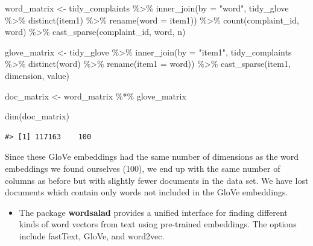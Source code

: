 \documentclass[
]{krantz}
\makeatletter
\newenvironment{Shaded}{\begin{snugshade}}{\end{snugshade}}
\newcommand{\AttributeTok}[1]{\textcolor[rgb]{0.77,0.63,0.00}{#1}}
\newcommand{\FunctionTok}[1]{\textcolor[rgb]{0.00,0.00,0.00}{#1}}
\newcommand{\NormalTok}[1]{#1}
\newcommand{\OtherTok}[1]{\textcolor[rgb]{0.56,0.35,0.01}{#1}}
\newcommand{\SpecialCharTok}[1]{\textcolor[rgb]{0.00,0.00,0.00}{#1}}
\newcommand{\StringTok}[1]{\textcolor[rgb]{0.31,0.60,0.02}{#1}}
\newenvironment{kframe}{%
\medskip{}
\setlength{\fboxsep}{.8em}
 \def\at@end@of@kframe{}%
 \ifinner\ifhmode%
  \def\at@end@of@kframe{\end{minipage}}%
  \begin{minipage}{\columnwidth}%
 \fi\fi%
 \def\FrameCommand##1{\hskip\@totalleftmargin \hskip-\fboxsep
 \colorbox{shadecolor}{##1}\hskip-\fboxsep
     \hskip-\linewidth \hskip-\@totalleftmargin \hskip\columnwidth}%
 \MakeFramed {\advance\hsize-\width
   \@totalleftmargin\z@ \linewidth\hsize
   \@setminipage}}%
 {\par\unskip\endMakeFramed%
 \at@end@of@kframe}
\renewenvironment{Shaded}{\begin{kframe}}{\end{kframe}}
\newenvironment{rmdblock}[1]
  {\begin{shaded*}
  \begin{itemize}[left = -1cm, labelsep = 1cm]
  \renewcommand{\labelitemi}{
    \raisebox{-.7\height}[0pt][0pt]{
      {\setkeys{Gin}{width=3em,keepaspectratio}\texttt{[image: images/\#1]}}
    }
  }
 
  \item
  }
  {
  \end{itemize}
  \end{shaded*}
  }
\newenvironment{rmdpackage}
  {\begin{rmdblock}{package}}
  {\end{rmdblock}}
\makeatother
\begin{document}
\begin{Shaded}
\begin{Highlighting}[]
\NormalTok{word\_matrix }\OtherTok{\textless{}{-}}\NormalTok{ tidy\_complaints }\SpecialCharTok{\%\textgreater{}\%}
  \FunctionTok{inner\_join}\NormalTok{(}\AttributeTok{by =} \StringTok{"word"}\NormalTok{,}
\NormalTok{             tidy\_glove }\SpecialCharTok{\%\textgreater{}\%}
               \FunctionTok{distinct}\NormalTok{(item1) }\SpecialCharTok{\%\textgreater{}\%}
               \FunctionTok{rename}\NormalTok{(}\AttributeTok{word =}\NormalTok{ item1)) }\SpecialCharTok{\%\textgreater{}\%}
  \FunctionTok{count}\NormalTok{(complaint\_id, word) }\SpecialCharTok{\%\textgreater{}\%}
  \FunctionTok{cast\_sparse}\NormalTok{(complaint\_id, word, n)}

\NormalTok{glove\_matrix }\OtherTok{\textless{}{-}}\NormalTok{ tidy\_glove }\SpecialCharTok{\%\textgreater{}\%}
  \FunctionTok{inner\_join}\NormalTok{(}\AttributeTok{by =} \StringTok{"item1"}\NormalTok{,}
\NormalTok{             tidy\_complaints }\SpecialCharTok{\%\textgreater{}\%}
               \FunctionTok{distinct}\NormalTok{(word) }\SpecialCharTok{\%\textgreater{}\%}
               \FunctionTok{rename}\NormalTok{(}\AttributeTok{item1 =}\NormalTok{ word)) }\SpecialCharTok{\%\textgreater{}\%}
  \FunctionTok{cast\_sparse}\NormalTok{(item1, dimension, value)}

\NormalTok{doc\_matrix }\OtherTok{\textless{}{-}}\NormalTok{ word\_matrix }\SpecialCharTok{\%*\%}\NormalTok{ glove\_matrix}

\FunctionTok{dim}\NormalTok{(doc\_matrix)}
\end{Highlighting}
\end{Shaded}

\begin{verbatim}
#> [1] 117163    100
\end{verbatim}

Since these GloVe embeddings had the same number of dimensions as the word embeddings we found ourselves (100), we end up with the same number of columns as before but with slightly fewer documents in the data set. We have lost documents which contain only words not included in the GloVe embeddings.

\begin{rmdpackage}
The package \textbf{wordsalad} \citep{R-wordsalad} provides a unified interface for finding different kinds of word vectors from text using pre-trained embeddings. The options include fastText, GloVe, and word2vec.
\end{rmdpackage}
\end{document}
